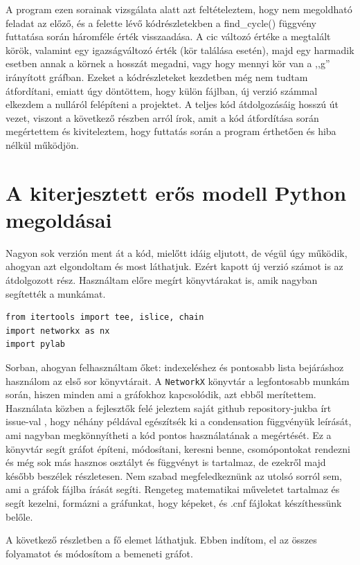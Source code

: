 \documentclass[
]{thesis-ekf}
\theoremstyle{definition}
\theoremstyle{remark}
\begin{document}
	A program ezen sorainak vizsgálata alatt azt feltételeztem, hogy nem megoldható feladat az előző, és a felette lévő kódrészletekben a find\_cycle() függvény futtatása során háromféle érték visszaadása. A cic változó értéke a megtalált körök, valamint egy igazságváltozó érték (kör találása esetén), majd egy harmadik esetben annak a körnek a hosszát megadni, vagy hogy mennyi kör van a ,,g'' irányított gráfban. Ezeket a kódrészleteket kezdetben még nem tudtam átfordítani, emiatt úgy döntöttem, hogy külön fájlban, új verzió számmal elkezdem a nulláról felépíteni a projektet. A teljes kód átdolgozásáig hosszú út vezet, viszont a következő részben arról írok, amit a kód átfordítása során megértettem és kiviteleztem, hogy futtatás során a program érthetően és hiba nélkül működjön.
	
	\section{A kiterjesztett erős modell Python megoldásai}
	
	Nagyon sok verzión ment át a kód, mielőtt idáig eljutott, de végül úgy működik, ahogyan azt elgondoltam és most láthatjuk. Ezért kapott új verzió számot is az átdolgozott rész. Használtam előre megírt könyvtárakat is, amik nagyban segítették a munkámat.

	\begin{lstlisting}
from itertools import tee, islice, chain
import networkx as nx
import pylab
	\end{lstlisting}

	Sorban, ahogyan felhasználtam őket: indexeléshez és pontosabb lista bejáráshoz használom az első sor könyvtárait. A \texttt{NetworkX} könyvtár a legfontosabb munkám során, hiszen minden ami a gráfokhoz kapcsolódik, azt ebből merítettem. Használata közben a fejlesztők felé jeleztem saját github repository-jukba írt issue-val \cite{link-github-issue}, hogy néhány példával egészítsék ki a condensation függvényük leírását, ami nagyban megkönnyítheti a kód pontos használatának a megértését. Ez a könyvtár segít gráfot építeni, módosítani, keresni benne, csomópontokat rendezni és még sok más hasznos osztályt és függvényt is tartalmaz, de ezekről majd később beszélek részletesen. Nem szabad megfeledkeznünk az utolsó sorról sem, ami a gráfok fájlba írását segíti. Rengeteg matematikai műveletet tartalmaz és segít kezelni, formázni a gráfunkat, hogy képeket, és .cnf fájlokat készíthessünk belőle.
	
	A következő részletben a fő elemet láthatjuk. Ebben indítom, el az összes folyamatot és módosítom a bemeneti gráfot.
	
\end{document}
